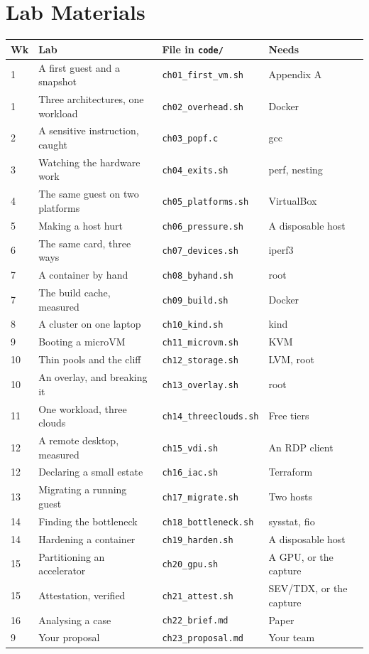 \section{Lab Materials}

\begin{longtable}{@{}L{1.1cm}L{5.0cm}L{4.4cm}L{4.1cm}@{}}
\toprule
{}
\textbf{Wk} & \textbf{Lab} & \textbf{File in \texttt{code/}} &
\textbf{Needs} \\
\midrule
{} & A first guest and a snapshot & \texttt{ch01\_first\_vm.sh} & Appendix A \\
1 & Three architectures, one workload & \texttt{ch02\_overhead.sh} & Docker \\
2 & A sensitive instruction, caught & \texttt{ch03\_popf.c} & gcc \\
3 & Watching the hardware work & \texttt{ch04\_exits.sh} & perf, nesting \\
4 & The same guest on two platforms & \texttt{ch05\_platforms.sh} &
VirtualBox \\
5 & Making a host hurt & \texttt{ch06\_pressure.sh} & A disposable host \\
6 & The same card, three ways & \texttt{ch07\_devices.sh} & iperf3 \\
7 & A container by hand & \texttt{ch08\_byhand.sh} & root \\
7 & The build cache, measured & \texttt{ch09\_build.sh} & Docker \\
8 & A cluster on one laptop & \texttt{ch10\_kind.sh} & kind \\
9 & Booting a microVM & \texttt{ch11\_microvm.sh} & KVM \\
10 & Thin pools and the cliff & \texttt{ch12\_storage.sh} & LVM, root \\
10 & An overlay, and breaking it & \texttt{ch13\_overlay.sh} & root \\
11 & One workload, three clouds & \texttt{ch14\_threeclouds.sh} & Free tiers \\
12 & A remote desktop, measured & \texttt{ch15\_vdi.sh} & An RDP client \\
12 & Declaring a small estate & \texttt{ch16\_iac.sh} & Terraform \\
13 & Migrating a running guest & \texttt{ch17\_migrate.sh} & Two hosts \\
14 & Finding the bottleneck & \texttt{ch18\_bottleneck.sh} & sysstat, fio \\
14 & Hardening a container & \texttt{ch19\_harden.sh} & A disposable host \\
15 & Partitioning an accelerator & \texttt{ch20\_gpu.sh} & A GPU, or the
capture \\
15 & Attestation, verified & \texttt{ch21\_attest.sh} & SEV/TDX, or the
capture \\
16 & Analysing a case & \texttt{ch22\_brief.md} & Paper \\
9 & Your proposal & \texttt{ch23\_proposal.md} & Your team \\
\bottomrule
\end{longtable}
